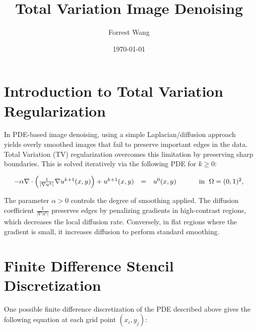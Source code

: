 \documentclass[11pt,letterpaper]{article}
\title{Total Variation Image Denoising}
\author{Forrest Wang}
\date{\today}
\begin{document}
\maketitle

\section{Introduction to Total Variation Regularization}

In PDE-based image denoising, using a simple Laplacian/diffusion approach yields overly smoothed images that fail to preserve important edges in the data. Total Variation (TV) regularization overcomes this limitation by preserving sharp boundaries. This is solved iteratively via the following PDE for $k \geq 0$:

\begin{equation*}
\begin{array}{rcll}
-\alpha \nabla \cdot \left( \frac{1}{|\nabla u^{k}|} \nabla u^{k+1}(x,y) \right) + u^{k+1}(x,y) & = & u^{0}(x,y) & \hspace{0.8cm}
\mbox{in $\; \Omega = (0,1)^2$},
\end{array}
\label{eqn:image}
\end{equation*}

\noindent The parameter $\alpha > 0$ controls the degree of smoothing applied. The diffusion coefficient $\frac{1}{|\nabla u^k|}$ preserves edges by penalizing gradients in high-contrast regions, which decreases the local diffusion rate. Conversely, in flat regions where the gradient is small, it increases diffusion to perform standard smoothing.

\section{Finite Difference Stencil Discretization}

One possible finite difference discretization of the PDE described above gives the following equation at each grid point $(x_{i}, y_{j})$:
\end{document}
